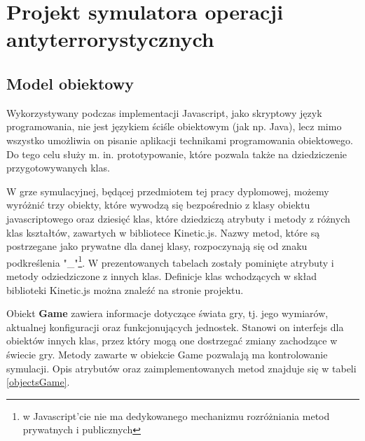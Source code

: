 \chapter{Projekt symulatora operacji antyterrorystycznych}
\section{Model obiektowy}
Wykorzystywany podczas implementacji Javascript, jako skryptowy język programowania, nie jest językiem ściśle obiektowym (jak np. Java), lecz mimo wszystko umożliwia on pisanie aplikacji technikami programowania obiektowego. Do tego celu służy m. in. prototypowanie, które pozwala także na dziedziczenie przygotowywanych klas.

W grze symulacyjnej, będącej przedmiotem tej pracy dyplomowej, możemy wyróżnić trzy obiekty, które wywodzą się bezpośrednio z klasy obiektu javascriptowego oraz dziesięć klas, które dziedziczą atrybuty i metody z różnych klas kształtów, zawartych w bibliotece Kinetic.js. Nazwy metod, które są postrzegane jako prywatne dla danej klasy, rozpoczynają się od znaku podkreślenia "\_"\footnote{w Javascript'cie nie ma dedykowanego mechanizmu rozróżniania metod prywatnych i publicznych}. W prezentowanych tabelach zostały pominięte atrybuty i metody odziedziczone z innych klas. Definicje klas wchodzących w skład biblioteki Kinetic.js można znaleźć na stronie projektu\cite{kineticPage}.

Obiekt \textbf{Game} zawiera informacje dotyczące świata gry, tj. jego wymiarów, aktualnej konfiguracji oraz funkcjonujących jednostek. Stanowi on interfejs dla obiektów innych klas, przez który mogą one dostrzegać zmiany zachodzące w świecie gry. Metody zawarte w obiekcie Game pozwalają ma kontrolowanie symulacji. Opis atrybutów oraz zaimplementowanych metod znajduje się w tabeli \ref{objectsGame}.

